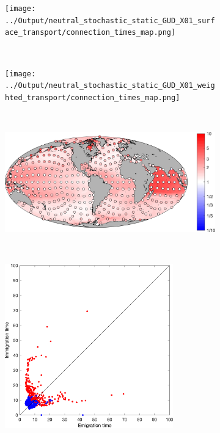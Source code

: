 \documentclass[12pt]{article}
\begin{document}
\begin{figure}[t!]
    \centering
    \begin{subfigure}[b]{0.5\textwidth}
        \centering
        \texttt{[image: ../Output/neutral\_stochastic\_static\_GUD\_X01\_surface\_transport/connection\_times\_map.png]}
    \end{subfigure}%
    \\
    \begin{subfigure}[b]{0.5\textwidth}
        \centering
        \texttt{[image: ../Output/neutral\_stochastic\_static\_GUD\_X01\_weighted\_transport/connection\_times\_map.png]}
    \end{subfigure}%
    \\
    \begin{subfigure}[b]{0.5\textwidth}
        \centering
        \includegraphics[width=1\textwidth]{../Figures/surface_vs_depth_map.png}
    \end{subfigure}
    \\
    \begin{subfigure}[b]{0.5\textwidth}
        \centering
        \includegraphics[width=0.8\textwidth]{../Figures/imm_vs_em.png}
    \end{subfigure}%
    \caption{}
\label{Connectivity_maps}
\end{figure}
\end{document}
